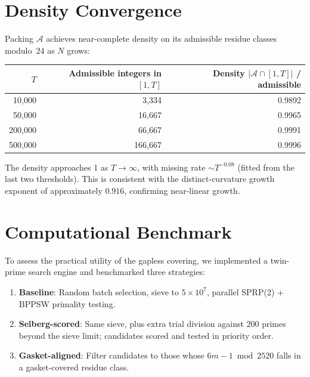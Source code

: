 \documentclass[12pt,a4paper]{article}
\theoremstyle{remark}
\begin{document}
\section{Density Convergence}

Packing $\mathcal{A}$ achieves near-complete density on its admissible
residue classes modulo~24 as $N$ grows:

\begin{center}
\begin{tabular}{rrr}
\toprule
\textbf{$T$} & \textbf{Admissible integers in $[1,T]$} &
\textbf{Density $|\mathcal{A} \cap [1,T]|$ / admissible} \\
\midrule
10{,}000 & 3{,}334 & 0.9892 \\
50{,}000 & 16{,}667 & 0.9965 \\
200{,}000 & 66{,}667 & 0.9991 \\
500{,}000 & 166{,}667 & 0.9996 \\
\bottomrule
\end{tabular}
\end{center}

The density approaches 1 as $T \to \infty$, with missing rate
$\sim T^{-0.08}$ (fitted from the last two thresholds). This is consistent
with the distinct-curvature growth exponent of approximately $0.916$,
confirming near-linear growth.

\section{Computational Benchmark}
\label{sec:benchmark}

To assess the practical utility of the gapless covering, we implemented
a twin-prime search engine and benchmarked three strategies:

\begin{enumerate}
\item \textbf{Baseline}: Random batch selection, sieve to $5\times 10^7$,
parallel SPRP(2) + BPPSW primality testing.
\item \textbf{Selberg-scored}: Same sieve, plus extra trial division
against 200 primes beyond the sieve limit; candidates scored and tested
in priority order.
\item \textbf{Gasket-aligned}: Filter candidates to those whose
$6m{-}1 \bmod 2520$ falls in a gasket-covered residue class.
\end{enumerate}
\end{document}

